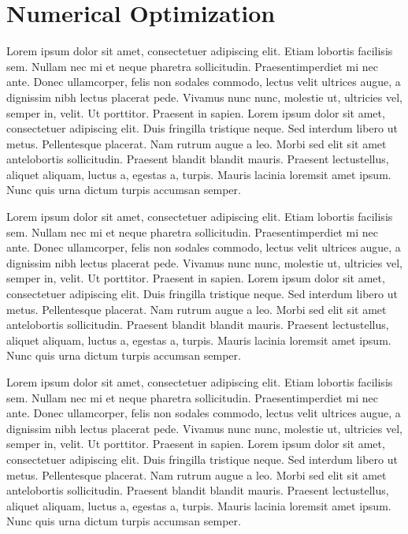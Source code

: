 \section{Numerical Optimization}

Lorem ipsum dolor sit amet, consectetuer adipiscing elit. Etiam lobortis facilisis sem. Nullam nec mi et neque pharetra sollicitudin. Praesentimperdiet mi nec ante. Donec ullamcorper, felis non sodales commodo, lectus velit ultrices augue, a dignissim nibh lectus placerat pede. Vivamus nunc nunc, molestie ut, ultricies vel, semper in, velit. Ut porttitor. Praesent in sapien. Lorem ipsum dolor sit amet, consectetuer adipiscing elit. Duis fringilla tristique neque. Sed interdum libero ut metus. Pellentesque placerat. Nam rutrum augue a leo. Morbi sed elit sit amet antelobortis sollicitudin. Praesent blandit blandit mauris. Praesent lectustellus, aliquet aliquam, luctus a, egestas a, turpis. Mauris lacinia loremsit amet ipsum. Nunc quis urna dictum turpis accumsan semper.

Lorem ipsum dolor sit amet, consectetuer adipiscing elit. Etiam lobortis facilisis sem. Nullam nec mi et neque pharetra sollicitudin. Praesentimperdiet mi nec ante. Donec ullamcorper, felis non sodales commodo, lectus velit ultrices augue, a dignissim nibh lectus placerat pede. Vivamus nunc nunc, molestie ut, ultricies vel, semper in, velit. Ut porttitor. Praesent in sapien. Lorem ipsum dolor sit amet, consectetuer adipiscing elit. Duis fringilla tristique neque. Sed interdum libero ut metus. Pellentesque placerat. Nam rutrum augue a leo. Morbi sed elit sit amet antelobortis sollicitudin. Praesent blandit blandit mauris. Praesent lectustellus, aliquet aliquam, luctus a, egestas a, turpis. Mauris lacinia loremsit amet ipsum. Nunc quis urna dictum turpis accumsan semper.

Lorem ipsum dolor sit amet, consectetuer adipiscing elit. Etiam lobortis facilisis sem. Nullam nec mi et neque pharetra sollicitudin. Praesentimperdiet mi nec ante. Donec ullamcorper, felis non sodales commodo, lectus velit ultrices augue, a dignissim nibh lectus placerat pede. Vivamus nunc nunc, molestie ut, ultricies vel, semper in, velit. Ut porttitor. Praesent in sapien. Lorem ipsum dolor sit amet, consectetuer adipiscing elit. Duis fringilla tristique neque. Sed interdum libero ut metus. Pellentesque placerat. Nam rutrum augue a leo. Morbi sed elit sit amet antelobortis sollicitudin. Praesent blandit blandit mauris. Praesent lectustellus, aliquet aliquam, luctus a, egestas a, turpis. Mauris lacinia loremsit amet ipsum. Nunc quis urna dictum turpis accumsan semper.


